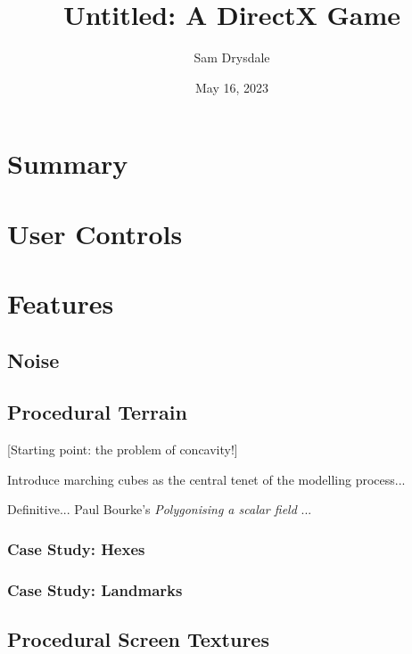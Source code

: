 \documentclass[a4paper, 11pt]{article}
\title{Untitled: A DirectX Game}
\author{Sam Drysdale}
\date{May 16, 2023}
\begin{document}
\graphicspath{{./Images/}}
\maketitle
\tableofcontents
\begin{flushleft}

\section{Summary}


\section{User Controls}


\section{Features}

\subsection{Noise} %

\subsection{Procedural Terrain} %

[Starting point: the problem of concavity!]

\vspace{5pt}\noindent
Introduce marching cubes as the central tenet of the modelling process...

\vspace{5pt}\noindent
Definitive... Paul Bourke's \textit{Polygonising a scalar field} \citeyearpar{bourkeMarchingCubes}...

\subsubsection{Case Study: Hexes}

\subsubsection{Case Study: Landmarks}

\subsection{Procedural Screen Textures} %


\end{flushleft}
\end{document}
